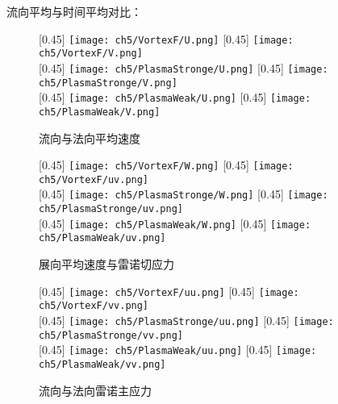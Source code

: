 流向平均与时间平均对比：
\begin{figure}[h]
  \centering
  [0.45\textwidth] 
    {\texttt{[image: ch5/VortexF/U.png]}}
  [0.45\textwidth]
    {\texttt{[image: ch5/VortexF/V.png]}}
  \\\bigskip
  [0.45\textwidth]
    {\texttt{[image: ch5/PlasmaStronge/U.png]}}
  [0.45\textwidth]
    {\texttt{[image: ch5/PlasmaStronge/V.png]}}
  \\\bigskip
  [0.45\textwidth]
    {\texttt{[image: ch5/PlasmaWeak/U.png]}}
  [0.45\textwidth]
    {\texttt{[image: ch5/PlasmaWeak/V.png]}}
  \caption{流向与法向平均速度}
\end{figure}
\begin{figure}[h]
  \centering
  [0.45\textwidth]
    {\texttt{[image: ch5/VortexF/W.png]}}
  [0.45\textwidth]
    {\texttt{[image: ch5/VortexF/uv.png]}}
  \\\bigskip
  [0.45\textwidth]
    {\texttt{[image: ch5/PlasmaStronge/W.png]}}
  [0.45\textwidth]
    {\texttt{[image: ch5/PlasmaStronge/uv.png]}}
  \\\bigskip
  [0.45\textwidth]
    {\texttt{[image: ch5/PlasmaWeak/W.png]}}
  [0.45\textwidth]
    {\texttt{[image: ch5/PlasmaWeak/uv.png]}}
  \caption{展向平均速度与雷诺切应力}
\end{figure}
\begin{figure}[h]
  \centering
  [0.45\textwidth]
    {\texttt{[image: ch5/VortexF/uu.png]}}
  [0.45\textwidth]
    {\texttt{[image: ch5/VortexF/vv.png]}}
  \\\bigskip
  [0.45\textwidth]
    {\texttt{[image: ch5/PlasmaStronge/uu.png]}}
  [0.45\textwidth]
    {\texttt{[image: ch5/PlasmaStronge/vv.png]}}
  \\\bigskip
  [0.45\textwidth]
    {\texttt{[image: ch5/PlasmaWeak/uu.png]}}
  [0.45\textwidth]
    {\texttt{[image: ch5/PlasmaWeak/vv.png]}}
  \caption{流向与法向雷诺主应力}
\end{figure}
